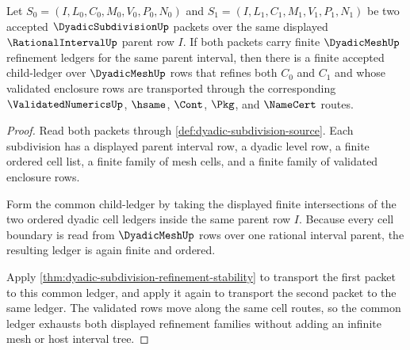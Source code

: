 \begin{theorem}
\label{thm:dyadic-subdivision-common-refinement-exhaustion}
Let $S_0=(I,L_0,C_0,M_0,V_0,P_0,N_0)$ and $S_1=(I,L_1,C_1,M_1,V_1,P_1,N_1)$ be two accepted $\DyadicSubdivisionUp$ packets over the same displayed $\RationalIntervalUp$ parent row $I$. If both packets carry finite $\DyadicMeshUp$ refinement ledgers for the same parent interval, then there is a finite accepted child-ledger over $\DyadicMeshUp$ rows that refines both $C_0$ and $C_1$ and whose validated enclosure rows are transported through the corresponding $\ValidatedNumericsUp$, $\hsame$, $\Cont$, $\Pkg$, and $\NameCert$ routes.
\end{theorem}
\begin{proof}
Read both packets through \autoref{def:dyadic-subdivision-source}. Each subdivision has a displayed parent interval row, a dyadic level row, a finite ordered cell list, a finite family of mesh cells, and a finite family of validated enclosure rows.

Form the common child-ledger by taking the displayed finite intersections of the two ordered dyadic cell ledgers inside the same parent row $I$. Because every cell boundary is read from $\DyadicMeshUp$ rows over one rational interval parent, the resulting ledger is again finite and ordered.

Apply \autoref{thm:dyadic-subdivision-refinement-stability} to transport the first packet to this common ledger, and apply it again to transport the second packet to the same ledger. The validated rows move along the same cell routes, so the common ledger exhausts both displayed refinement families without adding an infinite mesh or host interval tree.
\end{proof}

